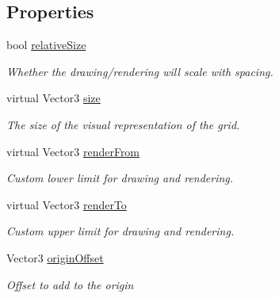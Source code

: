 \subsection*{Properties}
\begin{DoxyCompactItemize}
\item 
bool \hyperlink{class_g_f_grid_a65d207e3957240c935645db01a199419_a65d207e3957240c935645db01a199419}{relative\+Size}
\begin{DoxyCompactList}\small\item\em Whether the drawing/rendering will scale with spacing.\end{DoxyCompactList}\item 
virtual Vector3 \hyperlink{class_g_f_grid_a336f54e5b5f677871876dc3d90cc611d_a336f54e5b5f677871876dc3d90cc611d}{size}
\begin{DoxyCompactList}\small\item\em The size of the visual representation of the grid.\end{DoxyCompactList}\item 
virtual Vector3 \hyperlink{class_g_f_grid_a4556eac3905975b9024addb169c629d8_a4556eac3905975b9024addb169c629d8}{render\+From}
\begin{DoxyCompactList}\small\item\em Custom lower limit for drawing and rendering.\end{DoxyCompactList}\item 
virtual Vector3 \hyperlink{class_g_f_grid_af9ec4b040505718f58a7841087d9b72a_af9ec4b040505718f58a7841087d9b72a}{render\+To}
\begin{DoxyCompactList}\small\item\em Custom upper limit for drawing and rendering.\end{DoxyCompactList}\item 
Vector3 \hyperlink{class_g_f_grid_a6fb374bcb7d726ff28e3f14817260d6c_a6fb374bcb7d726ff28e3f14817260d6c}{origin\+Offset}
\begin{DoxyCompactList}\small\item\em Offset to add to the origin\end{DoxyCompactList}\item 

\end{DoxyCompactItemize}
